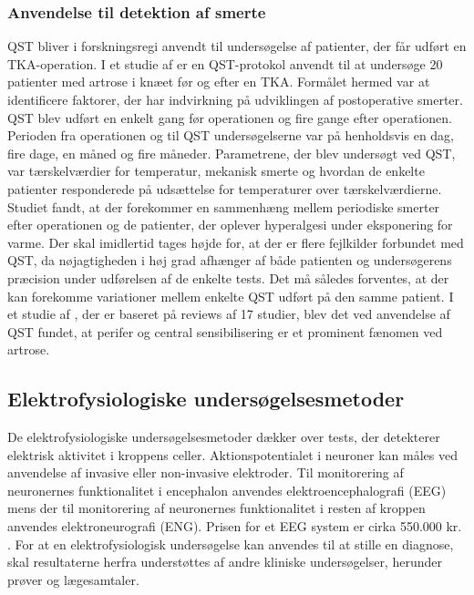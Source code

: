 \subsubsection{Anvendelse til detektion af smerte}
QST bliver i forskningsregi anvendt til undersøgelse af patienter, der får udført en TKA-operation. I et studie af  er en QST-protokol anvendt til at undersøge 20 patienter med artrose i knæet før og efter en TKA. Formålet hermed var at identificere faktorer, der har indvirkning på udviklingen af postoperative smerter. QST blev udført en enkelt gang før operationen og fire gange efter operationen. Perioden fra operationen og til QST undersøgelserne var på henholdsvis en dag, fire dage, en måned og fire måneder. Parametrene, der blev undersøgt ved QST, var tærskelværdier for temperatur, mekanisk smerte og hvordan de enkelte patienter responderede på udsættelse for temperaturer over tærskelværdierne. Studiet fandt, at der forekommer en sammenhæng mellem periodiske smerter efter operationen og de patienter, der oplever hyperalgesi under eksponering for varme. \citep{Martinez2007} Der skal imidlertid tages højde for, at der er flere fejlkilder forbundet med QST, da nøjagtigheden i høj grad afhænger af både patienten og undersøgerens præcision under udførelsen af de enkelte tests. Det må således forventes, at der kan forekomme variationer mellem enkelte QST udført på den samme patient. \citep{Yarnitsky2006} I et studie af , der er baseret på reviews af 17 studier, blev det ved anvendelse af QST fundet, at perifer og central sensibilisering er et prominent fænomen ved artrose.

\subsection{Elektrofysiologiske undersøgelsesmetoder}
De elektrofysiologiske undersøgelsesmetoder dækker over tests, der detekterer elektrisk aktivitet i kroppens celler. Aktionspotentialet i neuroner kan måles ved anvendelse af invasive eller non-invasive elektroder. Til monitorering af neuronernes funktionalitet i encephalon anvendes elektroencephalografi (EEG) mens der til monitorering af neuronernes funktionalitet i resten af kroppen anvendes elektroneurografi (ENG). Prisen for et EEG system er cirka 550.000 kr. \citep{Biosemi2016}. For at en elektrofysiologisk undersøgelse kan anvendes til at stille en diagnose, skal resultaterne herfra understøttes af andre kliniske undersøgelser, herunder prøver og lægesamtaler. \citep{Robinson2008} 

